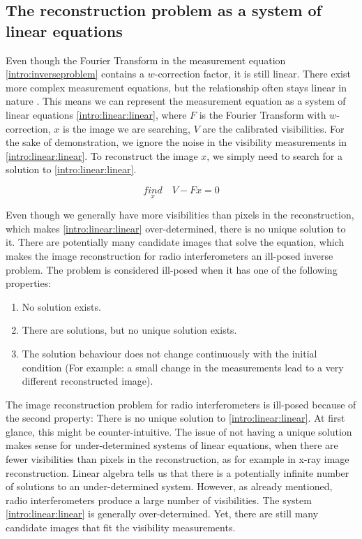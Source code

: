 \subsection{The reconstruction problem as a system of linear equations}
Even though the Fourier Transform in the measurement equation \eqref{intro:inverseproblem} contains a $w$-correction factor, it is still linear. There exist more complex measurement equations, but the relationship often stays linear in nature \cite{smirnov2011revisiting1, smirnov2011revisiting2, smirnov2011revisiting3, smirnov2011revisiting4}. This means we can represent the measurement equation as a system of linear equations  \eqref{intro:linear:linear}, where $F$ is the Fourier Transform with $w$-correction, $x$ is the image we are searching, $V$ are the calibrated visibilities. For the sake of demonstration, we ignore the noise in the visibility measurements in \eqref{intro:linear:linear}. To reconstruct the image $x$, we simply need to search for a solution to \eqref{intro:linear:linear}.

\begin{equation}\label{intro:linear:linear}
\underset{x}{find}\quad V - Fx = 0
\end{equation}

Even though we generally have more visibilities than pixels in the reconstruction, which makes \eqref{intro:linear:linear} over-determined, there is no unique solution to it. There are potentially many candidate images that solve the equation, which makes the image reconstruction for radio interferometers an ill-posed inverse problem. The problem is considered ill-posed when it has one of the following properties:
\begin{enumerate}
	\item No solution exists.
	\item There are solutions, but no unique solution exists.
	\item The solution behaviour does not change continuously with the initial condition (For example: a small change in the measurements lead to a very different reconstructed image).
\end{enumerate}
The image reconstruction problem for radio interferometers is ill-posed because of the second property: There is no unique solution to \eqref{intro:linear:linear}. At first glance, this might be counter-intuitive. The issue of not having a unique solution makes sense for under-determined systems of linear equations, when there are fewer visibilities than pixels in the reconstruction, as for example in x-ray image reconstruction\cite{felix2017compressed}. Linear algebra tells us that there is a potentially infinite number of solutions to an under-determined system. However, as already mentioned, radio interferometers produce a large number of visibilities. The system \eqref{intro:linear:linear} is generally over-determined. Yet, there are still many candidate images that fit the visibility measurements.

